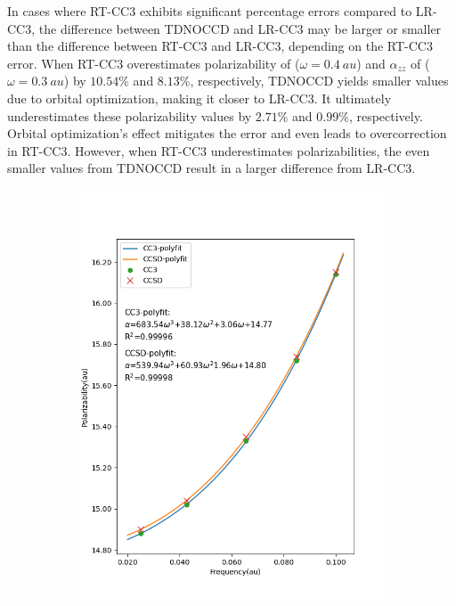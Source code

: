 In cases where RT-CC3 exhibits significant percentage errors compared to LR-CC3, the difference between TDNOCCD and LR-CC3 may be larger or smaller than the difference between RT-CC3 and LR-CC3, depending on the RT-CC3 error. When RT-CC3 overestimates polarizability of  ($\omega=0.4\ au$) and $\alpha_{zz}$ of  ($\omega=0.3\ au$) by $10.54\%$ and $8.13\%$, respectively, TDNOCCD yields smaller values due to orbital optimization, making it closer to LR-CC3. It ultimately underestimates these polarizability values by $2.71\%$ and $0.99\%$, respectively. Orbital optimization's effect mitigates the error and even leads to overcorrection in RT-CC3. However, when RT-CC3 underestimates polarizabilities, the even smaller values from TDNOCCD result in a larger difference from LR-CC3.
\begin{figure}
     \centering
     \begin{subfigure}{0.495\textwidth}
         \centering
         \includegraphics[width=\textwidth]{ch4/Figs/4-1.png}

\end{subfigure}
\end{figure}

